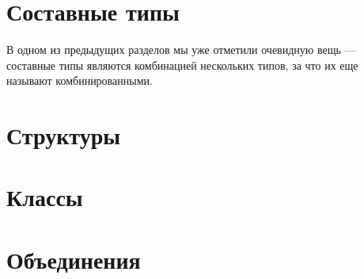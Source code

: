 \documentclass[book.tex]{subfiles}
\begin{document}



\maketitle

\section*{Составные типы}

В одном из предыдущих разделов мы уже отметили очевидную вещь --- составные типы являются комбинацией нескольких типов, за что их еще называют комбинированными. 

\section*{Структуры}

\section*{Классы}

\section*{Объединения}
\end{document}
